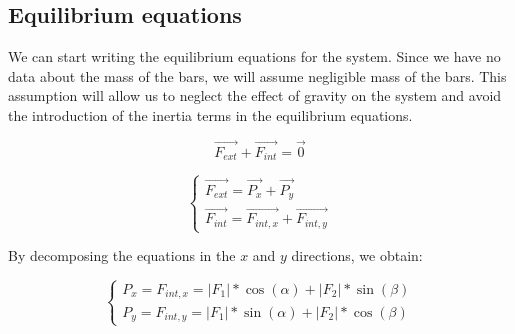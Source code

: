 \subsection{Equilibrium equations}

We can start writing the equilibrium equations for the system.
Since we have no data about the mass of the bars, we will assume negligible mass of the bars.
This assumption will allow us to neglect the effect of gravity on the system and avoid the introduction of the inertia terms in the equilibrium equations.

\begin{equation}
    \vec{F_{ext}} + \vec{F_{int}} = \vec{0}
    \label{eq:equilibrium_equations_1}
\end{equation}

\begin{equation}
    \begin{cases}
        \vec{F_{ext}} = \vec{P_x} + \vec{P_y} \\
        \vec{F_{int}} = \vec{F_{int,x}} + \vec{F_{int,y}}
    \end{cases}
\end{equation}

By decomposing the equations in the $x$ and $y$ directions, we obtain:

\begin{equation}
    \begin{cases}
        P_x = F_{int,x} = |F_1|*\cos(\alpha) + |F_2|*\sin(\beta) \\
        P_y = F_{int,y} = |F_1|*\sin(\alpha) + |F_2|*\cos(\beta)
    \end{cases}
    \label{eq:equilibrium_equations_2}
\end{equation}